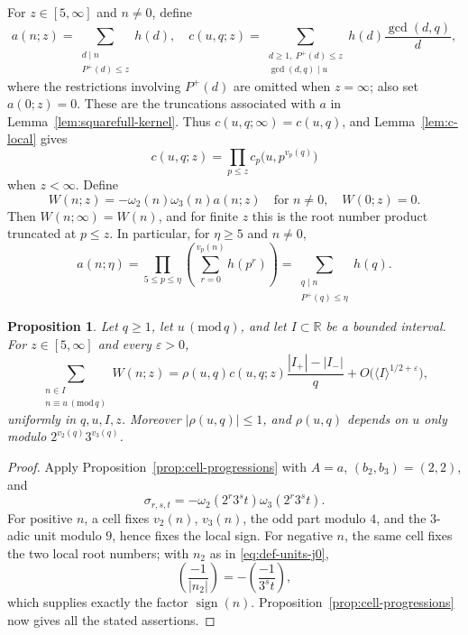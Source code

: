 \documentclass[12pt,reqno]{amsart}
\numberwithin{equation}{section}
\newtheorem{proposition}[theorem]{Proposition}
\theoremstyle{definition}
\renewcommand{\le}{\leqslant}
\renewcommand{\ge}{\geqslant}
\newcommand{\RR}{\mathbb{R}}
\DeclareMathOperator{\sign}{sign}
\newcommand{\rw}{W}
\renewcommand{\pmod}[1]{\,(\mathrm{mod}\,#1)}
\begin{document}
For $z\in[5,\infty]$ and $n\ne0$, define
\begin{equation}\label{eq:def-ac-trunc}
a(n;z)=\sum_{\substack{d\mid n\\P^+(d)\le z}}h(d),\quad
c(u,q;z)=\sum_{\substack{d\ge1,\ P^+(d)\le z\\\gcd(d,q)\mid u}}
h(d)\frac{\gcd(d,q)}d,
\end{equation}
where the restrictions involving $P^+(d)$ are omitted when $z=\infty$; also set $a(0;z)=0$.
These are the truncations associated with $a$ in Lemma~\ref{lem:squarefull-kernel}.
Thus $c(u,q;\infty)=c(u,q)$, and Lemma~\ref{lem:c-local} gives
\[
c(u,q;z)=\prod_{p\le z}c_p\bigl(u,p^{v_p(q)}\bigr)
\]
when $z<\infty$.
Define
\begin{equation}\label{eq:rw-eta-def}
\rw(n;z)=-\omega_2(n)\omega_3(n)a(n;z)\quad\text{for }n\ne0,
\quad \rw(0;z)=0.
\end{equation}
Then $\rw(n;\infty)=\rw(n)$, and for finite $z$ this is the root number product truncated at $p\le z$.
In particular, for $\eta\ge5$ and $n\ne0$,
\begin{equation}\label{eq:a-eta-conv}
a(n;\eta)
=\prod_{5\le p\le\eta}\left(\sum_{r=0}^{v_p(n)}h(p^r)\right)
=\sum_{\substack{q\mid n\\P^+(q)\le\eta}}h(q).
\end{equation}

\begin{proposition}\label{prop:rw-interval}
Let $q\ge1$, let $u\pmod q$, and let $I\subset\RR$ be a bounded interval.
For $z\in[5,\infty]$ and every $\varepsilon>0$,
\[
\sum_{\substack{n\in I\\n\equiv u\pmod q}}\rw(n;z)
=\rho(u,q)c(u,q;z)\frac{|I_+|-|I_-|}{q}
+O\bigl(\langle I\rangle^{1/2+\varepsilon}\bigr),
\]
uniformly in $q,u,I,z$.
Moreover $|\rho(u,q)|\le1$, and $\rho(u,q)$ depends on $u$ only modulo $2^{v_2(q)}3^{v_3(q)}$.
\end{proposition}

\begin{proof}
Apply Proposition~\ref{prop:cell-progressions} with $A=a$, $(b_2,b_3)=(2,2)$, and
\[
\sigma_{r,s,t}
=-\omega_2(2^r3^s t)\omega_3(2^r3^s t).
\]
For positive $n$, a cell fixes $v_2(n)$, $v_3(n)$, the odd part modulo $4$, and the $3$-adic unit modulo $9$, hence fixes the local sign.
For negative $n$, the same cell fixes the two local root numbers; with $n_2$ as in \eqref{eq:def-units-j0},
\[
\left(\frac{-1}{|n_2|}\right)
=-\left(\frac{-1}{3^s t}\right),
\]
which supplies exactly the factor $\sign(n)$.
Proposition~\ref{prop:cell-progressions} now gives all the stated assertions.
\end{proof}
\end{document}
